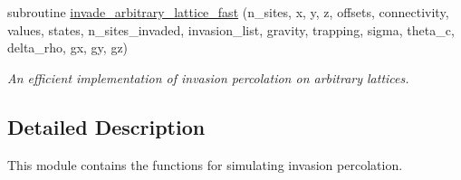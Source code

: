\begin{DoxyCompactItemize}
subroutine \hyperlink{classinvasion__percolation_ab1f938022112bd409e736f30a8751ec0}{invade\-\_\-arbitrary\-\_\-lattice\-\_\-fast} (n\-\_\-sites, x, y, z, offsets, connectivity, values, states, n\-\_\-sites\-\_\-invaded, invasion\-\_\-list, gravity, trapping, sigma, theta\-\_\-c, delta\-\_\-rho, gx, gy, gz)
\begin{DoxyCompactList}\small\item\em \-An efficient implementation of invasion percolation on arbitrary lattices. \end{DoxyCompactList}\end{DoxyCompactItemize}


\subsection{\-Detailed \-Description}
\-This module contains the functions for simulating invasion percolation. 


